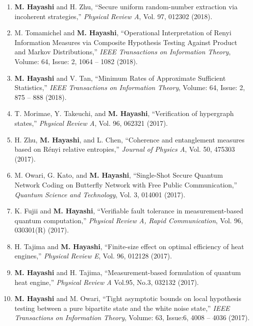 \documentclass[a4paper,12pt,oneside]{article}
\begin{document}
\begin{enumerate}
\item 
\textbf{M. Hayashi} and H. Zhu,
``Secure uniform random-number extraction via incoherent strategies,''
{\em Physical Review A}, Vol. 97, 012302 (2018).

\item 
M. Tomamichel and \textbf{M. Hayashi}, 
``Operational Interpretation of Renyi Information Measures via Composite Hypothesis Testing Against Product and Markov Distributions,''
{\em IEEE Transactions on Information Theory},
Volume: 64, Issue: 2, 1064 -- 1082 (2018). 

\item 
\textbf{M. Hayashi} and V. Tan, 
``Minimum Rates of Approximate Sufficient Statistics,''
{\em IEEE Transactions on Information Theory},
Volume: 64, Issue: 2, 875 -- 888 (2018). 

\item 
T. Morimae, Y. Takeuchi, and \textbf{M. Hayashi},
``Verification of hypergraph states,''
{\em Physical Review A}, Vol. 96, 062321 (2017).

\item 
H. Zhu, \textbf{M. Hayashi}, and L. Chen, 
``Coherence and entanglement measures based on R\'{e}nyi relative entropies,''
{\em Journal of Physics A},
Vol. 50, 475303 (2017).

\item
M. Owari, G. Kato, and \textbf{M. Hayashi},
``Single-Shot Secure Quantum Network Coding on Butterfly Network with Free Public Communication,''
{\em Quantum Science and Technology},
Vol. 3, 014001 (2017). 

\item
K. Fujii and \textbf{M. Hayashi},
``Verifiable fault tolerance in measurement-based quantum computation,''
{\em Physical Review A, Rapid Communication},
Vol. 96, 030301(R) (2017).

\item
H. Tajima and \textbf{M. Hayashi},
``Finite-size effect on optimal efficiency of heat engines,''
{\em Physical Review E}, Vol. 96, 012128 (2017).

\item
\textbf{M. Hayashi} and H. Tajima, 
``Measurement-based formulation of quantum heat engine,'' 
{\em Physical Review A} Vol.95, No.3, 032132 (2017). 

\item
\textbf{M. Hayashi} and M. Owari, 
``Tight asymptotic bounds on local hypothesis testing between a pure bipartite state and the white noise state,'' 
{\em IEEE Transactions on Information Theory}, 
Volume: 63, Issue:6, 4008 -- 4036 (2017). 


\end{enumerate}
\end{document}

